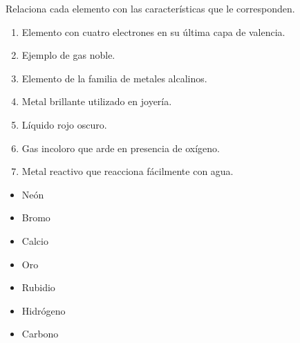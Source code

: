 \begin{boxK}
    Relaciona cada elemento con las características que le corresponden.

    \begin{minipage}{0.6\textwidth}
        \begin{enumerate}\footnotesize
            \item Elemento con cuatro electrones en su última capa de valencia.
            \item Ejemplo de gas noble.
            \item Elemento de la familia de metales alcalinos.
            \item Metal brillante utilizado en joyería.
            \item Líquido rojo oscuro.
            \item Gas incoloro que arde en presencia de oxígeno.
            \item Metal reactivo que reacciona fácilmente con agua.
        \end{enumerate}
    \end{minipage}\hfill
    \begin{minipage}{0.25\textwidth}
        \begin{itemize}
            \item[\rule{1cm}{0.2mm}] Neón
            \item[\rule{1cm}{0.2mm}] Bromo
            \item[\rule{1cm}{0.2mm}] Calcio
            \item[\rule{1cm}{0.2mm}] Oro
            \item[\rule{1cm}{0.2mm}] Rubidio
            \item[\rule{1cm}{0.2mm}] Hidrógeno
            \item[\rule{1cm}{0.2mm}] Carbono
        \end{itemize}
    \end{minipage}
\end{boxK}



